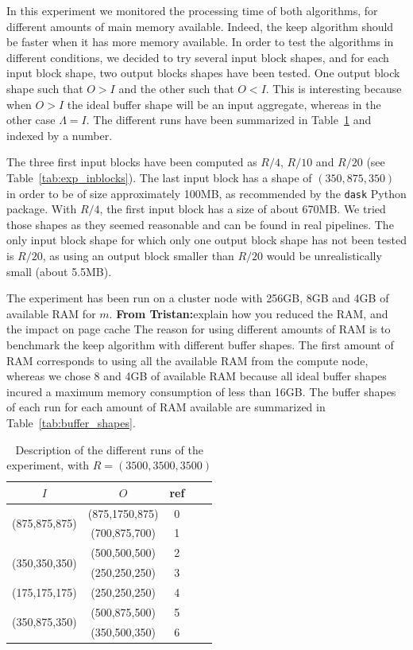 \documentclass[sigconf, nonacm]{acmart}
\newcommand{\tristan}[1]{\color{orange}\textbf{From Tristan:}#1\color{black}}
\begin{document}
In this experiment we monitored the processing time of both algorithms, for
different amounts of main memory available.
Indeed, the keep algorithm should be faster when it has more memory available.
In order to test the algorithms in different conditions, we decided to try
several input block shapes, and for each input block shape, two output blocks
shapes have been tested. One output block shape such that $O>I$ and the other
such that $O<I$. This is interesting because when $O>I$ the ideal buffer shape
will be an input aggregate, whereas in the other case $\Lambda=I$.
The different runs have been summarized in Table~\ref{tab:exp} and indexed by
a number.

The three first input blocks have been computed as $R/4$, $R/10$ and $R/20$
(see Table~\ref{tab:exp_inblocks}).
The last input block has a shape of $(350,875,350)$ in order to be of size
approximately 100MB, as recommended by the \texttt{dask} Python package.
With $R/4$, the first input block has a size of about 670MB.
We tried those shapes as they seemed reasonable and can be found in real pipelines.
The only input block shape for which only one output block shape has not been tested
is $R/20$, as using an output block smaller than $R/20$ would be unrealistically
small (about 5.5MB).

The experiment has been run on a cluster node with 256GB, 8GB and 4GB of
available RAM for $m$. \tristan{explain how you reduced the RAM, and the impact on page cache}
The reason for using different amounts of RAM is to benchmark the keep algorithm
with different buffer shapes.
The first amount of RAM corresponds to using all the
available RAM from the compute node, whereas we chose 8 and 4GB of available RAM
because all ideal buffer shapes incured a maximum memory consumption of less than
16GB.
The buffer shapes of each run for each amount of RAM available are summarized in
Table~\ref{tab:buffer_shapes}.

\begin{table}[ht]
  \centering
  \caption{Description of the different runs of the experiment, with $R=(3500,3500,3500)$}

   \begin{tabular}[t]{| c | c | c | c | c |}
   \hline
   $I$ & $O$ & ref \\
   \hline
   \multirow{2}{*}{(875,875,875)} & (875,1750,875) & 0 \\
   & (700,875,700) & 1 \\
   \hline
   \multirow{2}{*}{(350,350,350)} & (500,500,500) & 2 \\
   & (250,250,250) & 3 \\
   \hline
   \multirow{1}{*}{(175,175,175)} & (250,250,250) & 4 \\
   \hline
   \multirow{2}{*}{(350,875,350)} & (500,875,500) & 5 \\
   & (350,500,350) & 6 \\
   \hline
   \end{tabular}

   \label{tab:exp}

\end{table}
\end{document}
